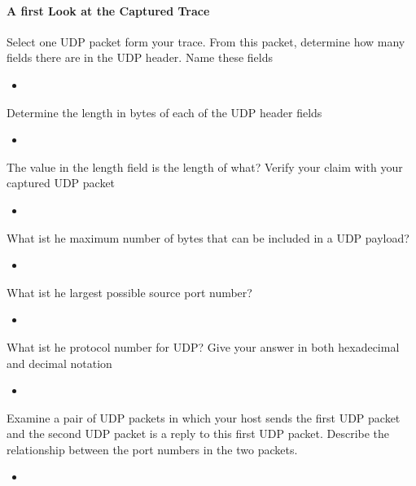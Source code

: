 \documentclass{article}
\begin{document}
\paragraph{A first Look at the Captured Trace}
    \item Select one UDP packet form your trace.  From this packet, determine how many fields there are in the UDP header.  Name these fields
        \begin{itemize}
          \item 
        \end{itemize}

    \item Determine the length in bytes of each of the UDP header fields
        \begin{itemize}
          \item 
        \end{itemize}

    \item The value in the length field is the length of what?  Verify your claim with your captured UDP packet
        \begin{itemize}
          \item 
        \end{itemize}

    \item What ist he maximum number of bytes that can be included in a UDP payload?
        \begin{itemize}
          \item 
        \end{itemize}

    \item What ist he largest possible source port number?
        \begin{itemize}
          \item 
        \end{itemize}

    \item What ist he protocol number for UDP?  Give your answer in both hexadecimal and decimal notation
        \begin{itemize}
          \item 
        \end{itemize}

    \item Examine a pair of UDP packets in which your host sends the first UDP packet and the second UDP packet is a reply to this first UDP packet.  Describe the relationship between
    the port numbers in the two packets.
        \begin{itemize}
          \item 
        \end{itemize}
\end{document}
